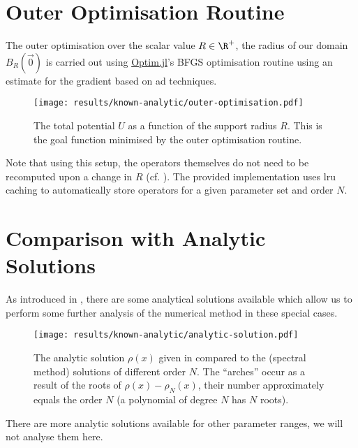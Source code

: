 \section{Outer Optimisation Routine}
The outer optimisation over the scalar value $R \in \R^+$, the radius of our domain $B_R(\vec{0})$ is carried out using \href{https://github.com/JuliaNLSolvers/Optim.jl}{Optim.jl}'s BFGS optimisation routine \parencite{2023-optim-jl} using an estimate for the gradient based on \gls{ad} techniques.

\begin{figure}[H]
  \centering
  \texttt{[image: results/known-analytic/outer-optimisation.pdf]}
  \caption[Outer Optimisation Routine]{The total potential $U$ as a function of the support radius $R$. This is the goal function minimised by the outer optimisation routine.}
  \label{fig:outer-optimisation}
\end{figure}

Note that using this setup, the operators themselves do not need to be recomputed upon a change in $R$ (cf. ).
The provided implementation uses \gls{lru} caching to automatically store operators for a given parameter set and order $N$.

\pagebreak
\section{Comparison with Analytic Solutions}
As introduced in , there are some analytical solutions available which allow us to perform some further analysis of the numerical method in these special cases.

\begin{figure}[H]
  \centering
  \texttt{[image: results/known-analytic/analytic-solution.pdf]}
  \caption[Comparison with analytical solutions and error]{
    The analytic solution $\rho(x)$ given in  compared to the (spectral method) solutions of different order $N$.
    The ``arches'' occur as a result of the roots of $\rho(x) - \rho_N(x)$, their number approximately equals the order $N$ (a polynomial of degree $N$ has $N$ roots).
  }
  \label{fig:analytic-solution}
\end{figure}

There are more analytic solutions available for other parameter ranges, we will not analyse them here.




